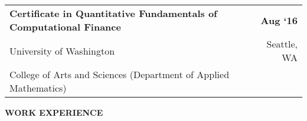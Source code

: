 \documentclass[10pt, letterpaper]{letter}
\newcommand{\highlightcolor}{RoyalBlue}
\newcommand{\sectionTitle}[1]{ \vspace{1em} \raggedright{ \color{\highlightcolor} \large \textbf{ \uppercase{ #1}}}}
\begin{document}
        \begin{tabularx}{\textwidth}{X r}
            \textbf{Certificate in Quantitative Fundamentals of Computational Finance} & \textbf{
    Aug ‘16} \\
            \quad University of Washington & 
    Seattle, 
        WA \\
            \quad College of Arts and Sciences (Department of Applied Mathematics) & \\
            
            
        \end{tabularx}
    

    \sectionTitle{Work Experience}
\end{document}
